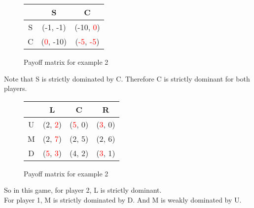 \documentclass[11pt]{article}
\newcommand{\red}[1]{\textcolor{red}{#1}}
\begin{document}
		\begin{example}
			\begin{figure}[h]
				\centering
				\begin{tabular}{c|c|c}
					 & S & C \\
					\hline
					S & (-1, -1) & (-10, \red{0})\\
					\hline
					C & (\red{0}, -10) & (\red{-5}, \red{-5})
				\end{tabular}
				\caption{Payoff matrix for example 2}
			\end{figure}
			Note that S is strictly dominated by C. Therefore C is strictly dominant for both players.
		\end{example}
		
		\begin{example}
			\begin{figure}[h]
				\centering
				\begin{tabular}{c|c|c|c}
					 & L & C & R\\
					\hline
					U & (2, \red{2}) & (\red{5}, 0) & (\red{3}, 0)\\
					\hline
					M & (2, \red{7}) & (2, 5) & (2, 6)\\
					\hline 
					D & (\red{5}, \red{3}) & (4, 2) & (\red{3}, 1)
				\end{tabular}
				\caption{Payoff matrix for example 2}
			\end{figure}
			So in this game, for player 2, L is strictly dominant. \\For player 1, M is strictly dominated by D. And M is weakly dominated by U.
		\end{example}
		
\end{document}
